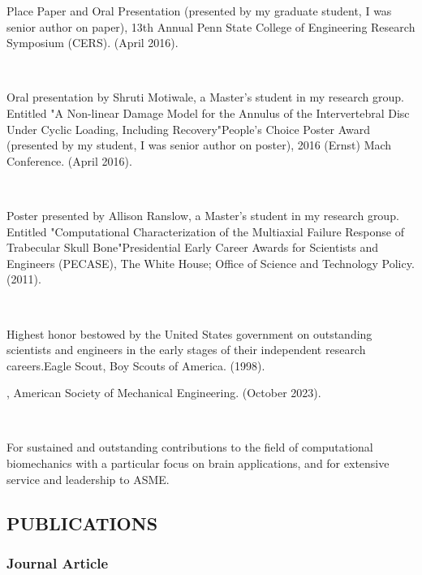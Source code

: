 \documentclass[a4paper,10pt]{article}
\begin{document}
\First Place Paper and Oral Presentation (presented by my graduate student, I was senior author on paper), 13th Annual Penn State College of Engineering Research Symposium (CERS). (April 2016).

\ 

Oral presentation by Shruti Motiwale, a Master's student in my research group. Entitled "A Non-linear Damage Model for the Annulus of the Intervertebral Disc Under Cyclic Loading, Including Recovery"People's Choice Poster Award (presented by my student, I was senior author on poster), 2016 (Ernst) Mach Conference. (April 2016).

\ 

Poster presented by Allison Ranslow, a Master's student in my research group. Entitled "Computational Characterization of the Multiaxial Failure Response of Trabecular Skull Bone"Presidential Early Career Awards for Scientists and Engineers (PECASE), The White House; Office of Science and Technology Policy. (2011).

\ 

Highest honor bestowed by the United States government on outstanding scientists and engineers in the early stages of their independent research careers.Eagle Scout, Boy Scouts of America. (1998).

\Fellow, American Society of Mechanical Engineering. (October 2023).

\ 

For sustained and outstanding contributions to the field of computational biomechanics with a particular focus on brain applications, and for extensive service and leadership to ASME.


\subsection{PUBLICATIONS}\label{publications}

\subsubsection{Journal Article}\label{journal-article}
\end{document}

